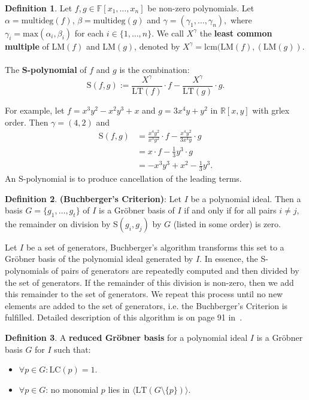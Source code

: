 \documentclass[thesis=M,english]{FITthesis}[2012/10/20]
\theoremstyle{remark}
\theoremstyle{definition}
\newtheorem{DF}{Definition}[section]
\begin{document}
\begin{DF}
Let $f,g \in \mathbb{F}[x_1,\ldots,x_n]$ be non-zero polynomials. Let $\alpha = \text{multideg}(f)$, $\beta = \text{multideg}(g)$ and ${\gamma = (\gamma_1,\ldots,\gamma_n)},$ where ${\gamma_i = \text{max}(\alpha_i,\beta_i)}$ for each $i \in \{1,\ldots,n\}.$ We call $X^\gamma$ the \textbf{least common multiple} of LM$(f)$ and LM$(g)$, denoted by $X^\gamma = \text{lcm(LM}(f),(\text{LM}(g)).$ \\ \\
\noindent The \textbf{S-polynomial} of $f$ and $g$ is the combination:
$$
\text{S}(f,g) := \frac{X^\gamma}{\text{LT}(f)}\cdot f - \frac{X^\gamma}{\text{LT}(g)}\cdot g.
$$
\end{DF}
\noindent For example, let $f=x^3y^2 - x^2y^3 + x$ and $g = 3x^4y + y^2$ in $\mathbb{R}[x,y]$ with grlex order. Then $\gamma = (4,2)$ and
\begin{align*}
\text{S}(f,g) &= \frac{x^4y^2}{x^3y^2}\cdot f - \frac{x^4y^2}{3x^4y}\cdot g \\
&= x\cdot f - \frac{1}{3}y^3\cdot g \\
&= -x^3y^3 + x^2 - \frac{1}{3}y^3.
\end{align*}
An S-polynomial is  to produce cancellation of the leading terms.
\begin{DF}
\textbf{(Buchberger's Criterion)}: Let $I$ be a polynomial ideal. Then a basis $G = \{g_1,\ldots,g_t\}$ of $I$ is a Gröbner basis of $I$ if and only if for all pairs $i\neq j$, the remainder on division by S$(g_i,g_j)$ by $G$ (listed in some order) is zero.
\end{DF}
\noindent Let $I$ be a set of generators, Buchberger's algorithm transforms this set to a Gröbner basis of the polynomial ideal generated by $I$. In essence, the S-polynomials of pairs of generators are repeatedly computed and then divided by the set of generators. If the remainder of this division is non-zero, then we add this remainder to the set of generators. We repeat this process until no new elements are added to the set of generators, i.e. the Buchberger's Criterion is fulfilled. Detailed description of this algorithm is on page 91 in~\cite{algGeom}.
\begin{DF}
A \textbf{reduced Gröbner basis} for a polynomial ideal $I$ is a Gröbner basis $G$ for $I$ such that:
\begin{itemize}
\item $\forall p \in G: \text{LC}(p) = 1.$
\item $\forall p \in G$: no monomial $p$ lies in $\langle\text{LT}(G \setminus \{p\}) \rangle.$
\end{itemize}
\end{DF}
\end{document}

